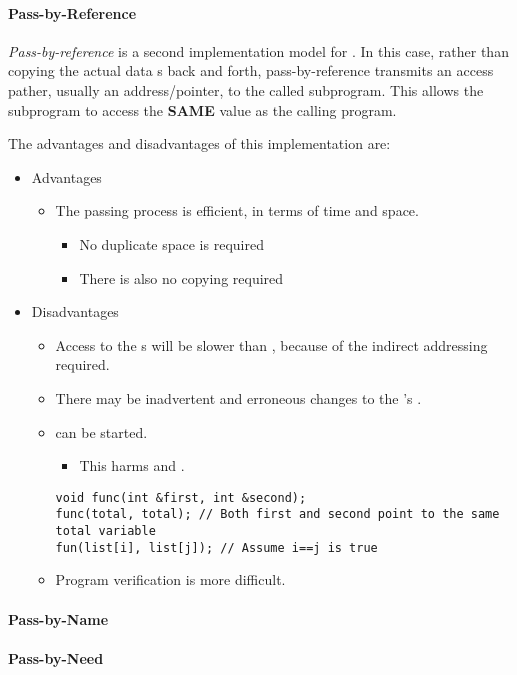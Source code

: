 \paragraph{Pass-by-Reference}\label{par:Parameter_Passing-Pass_By_Reference}
\begin{definition}\label{def:Pass_By_Reference}
  \emph{Pass-by-reference} is a second implementation model for .
  In this case, rather than copying the actual data s back and forth, pass-by-reference transmits an access pather, usually an address/pointer, to the called subprogram.
  This allows the subprogram to access the \textbf{SAME} value as the calling program.

  The advantages and disadvantages of this implementation are:
  \begin{itemize}[noitemsep]
  \item Advantages
    \begin{itemize}[noitemsep]
    \item The passing process is efficient, in terms of time and space.
      \begin{itemize}[noitemsep]
      \item No duplicate space is required
      \item There is also no copying required
      \end{itemize}
    \end{itemize}
  \item Disadvantages
    \begin{itemize}[noitemsep]
    \item Access to the s will be slower than , because of the indirect addressing required.
    \item There may be inadvertent and erroneous changes to the 's .
    \item {} can be started.
      \begin{itemize}[noitemsep]
      \item This harms  and .
      \end{itemize}
\begin{verbatim}
void func(int &first, int &second);
func(total, total); // Both first and second point to the same total variable
fun(list[i], list[j]); // Assume i==j is true
\end{verbatim}
    \item Program verification is more difficult.
    \end{itemize}
  \end{itemize}
\end{definition}

\paragraph{Pass-by-Name}\label{par:Parameter_Passing-Pass_By_Name}
\paragraph{Pass-by-Need}\label{par:Parameter_Passing-Pass_By_Need}


